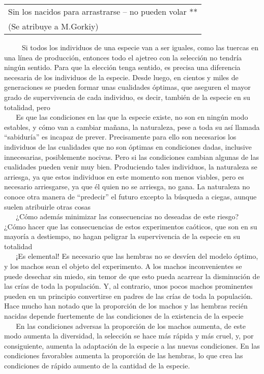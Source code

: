 \begin{longtable}[]{@{}l@{}}
\toprule
Sin los nacidos para arrastrarse -- no pueden volar **\tabularnewline
(Se atribuye a M.Gorkiy)\tabularnewline
\bottomrule
\end{longtable}

~ ~ ~ Si todos los individuos de una especie van a ser iguales, como las
tuercas en una línea de producción, entonces todo el ajetreo con la
selección no tendría ningún sentido. Para que la elección tenga sentido,
es precisa una diferencia necesaria de los individuos de la especie.
Desde luego, en cientos y miles de generaciones se pueden formar unas
cualidades óptimas, que aseguren el mayor grado de supervivencia de cada
individuo, es decir, también de la especie en su totalidad, pero\\
\hspace*{0.333em} ~ ~ Es que las condiciones en las que la especie
existe, no son en ningún modo estables, y cómo van a cambiar mañana, la
naturaleza, pese a toda su así llamada ``sabiduría'' es incapaz de
prever. Precisamente para ello son necesarios los individuos de las
cualidades que no son óptimas en condiciones dadas, inclusive
innecesarias, posiblemente nocivas. Pero si las condiciones cambian
algunas de las cualidades pueden venir muy bien. Produciendo tales
individuos, la naturaleza se arriesga, ya que estos individuos en este
momento son menos viables, pero es necesario arriesgarse, ya que él
quien no se arriesga, no gana. La naturaleza no conoce otra manera de
``predecir'' el futuro excepto la búsqueda a ciegas, aunque suelen
atribuirle otras cosas\\
\hspace*{0.333em} ~ ~ ¿Cómo además minimizar las consecuencias no
deseadas de este riesgo? ¿Cómo hacer que las consecuencias de estos
experimentos caóticos, que son en su mayoría a destiempo, no hagan
peligrar la supervivencia de la especie en su totalidad\\
\hspace*{0.333em} ~ ~ ¡Es elemental! Es necesario que las hembras no se
desvíen del modelo óptimo, y los machos sean el objeto del experimento.
A los machos inconvenientes se puede desechar sin miedo, sin temor de
que esto pueda acarrear la disminución de las crías de toda la
populación. Y, al contrario, unos pocos machos prominentes pueden en un
principio convertirse en padres de las crías de toda la populación. Hace
mucho han notado que la proporción de los machos y las hembras recién
nacidas depende fuertemente de las condiciones de la existencia de la
especie\\
\hspace*{0.333em} ~ ~ En las condiciones adversas la proporción de los
machos aumenta, de este modo aumenta la diversidad, la selección se hace
más rápida y más cruel, y, por consiguiente, aumenta la adaptación de la
especie a las nuevas condiciones. En las condiciones favorables aumenta
la proporción de las hembras, lo que crea las condiciones de rápido
aumento de la cantidad de la especie.

